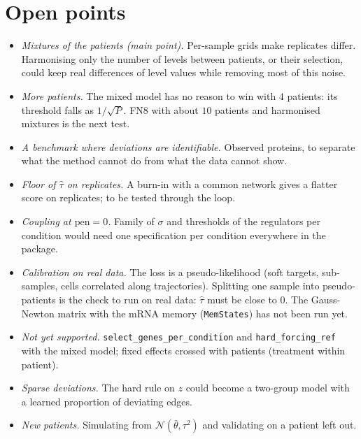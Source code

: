 \documentclass[a4paper, 11pt]{article}
\newcommand{\pen}{\mathrm{pen}}
\newcommand{\tb}{\bar\theta}
\theoremstyle{plain}
\theoremstyle{remark}
\begin{document}
\section{Open points}\label{sec:open}

\begin{itemize}[leftmargin=*]
\item \emph{Mixtures of the patients (main point).} Per-sample grids make replicates differ. Harmonising only the number of levels between patients, or their selection, could keep real differences of level values while removing most of this noise.
\item \emph{More patients.} The mixed model has no reason to win with $4$ patients: its threshold falls as $1 / \sqrt P$. FN8 with about $10$ patients and harmonised mixtures is the next test.
\item \emph{A benchmark where deviations are identifiable.} Observed proteins, to separate what the method cannot do from what the data cannot show.
\item \emph{Floor of $\hat\tau$ on replicates.} A burn-in with a common network gives a flatter score on replicates; to be tested through the loop.
\item \emph{Coupling at $\pen = 0$.} Family of $\sigma$ and thresholds of the regulators per condition would need one specification per condition everywhere in the package.
\item \emph{Calibration on real data.} The loss is a pseudo-likelihood (soft targets, sub-samples, cells correlated along trajectories). Splitting one sample into pseudo-patients is the check to run on real data: $\hat\tau$ must be close to $0$. The Gauss-Newton matrix with the mRNA memory (\texttt{MemStates}) has not been run yet.
\item \emph{Not yet supported.} \texttt{select\_genes\_per\_condition} and \texttt{hard\_forcing\_ref} with the mixed model; fixed effects crossed with patients (treatment within patient).
\item \emph{Sparse deviations.} The hard rule on $z$ could become a two-group model with a learned proportion of deviating edges.
\item \emph{New patients.} Simulating from $\mathcal N(\tb, \tau^2)$ and validating on a patient left out.
\end{itemize}
\end{document}
